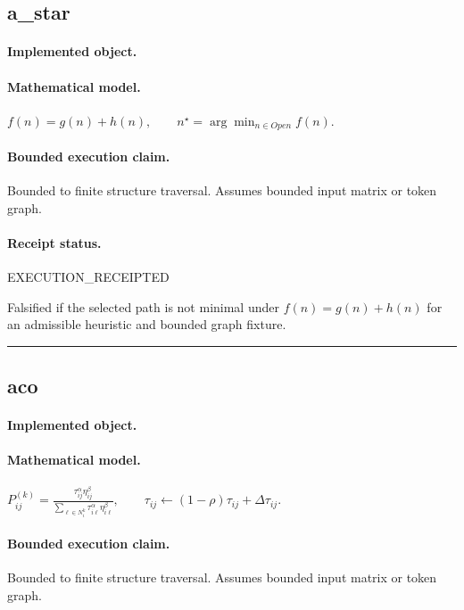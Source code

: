 \subsection{a\_star}
\paragraph{Implemented object.} 
\paragraph{Mathematical model.} $f(n)=g(n)+h(n), \qquad n^\star=\arg\min_{n\in Open} f(n).$
\paragraph{Bounded execution claim.} Bounded to finite structure traversal. Assumes bounded input matrix or token graph.
\paragraph{Receipt status.} EXECUTION\_RECEIPTED
\begin{falsifier}
Falsified if the selected path is not minimal under $f(n)=g(n)+h(n)$ for an admissible heuristic and bounded graph fixture.
\end{falsifier}

\vspace{1em}\hrule\vspace{1em}
\subsection{aco}
\paragraph{Implemented object.} 
\paragraph{Mathematical model.} $P_{ij}^{(k)} = \frac{\tau_{ij}^{\alpha}\eta_{ij}^{\beta}}{\sum_{\ell\in N_i^k}\tau_{i\ell}^{\alpha}\eta_{i\ell}^{\beta}}, \qquad \tau_{ij}\leftarrow(1-\rho)\tau_{ij}+\Delta\tau_{ij}.$
\paragraph{Bounded execution claim.} Bounded to finite structure traversal. Assumes bounded input matrix or token graph.
